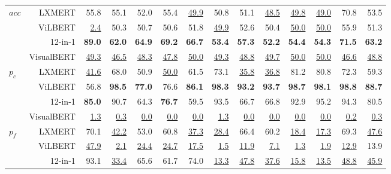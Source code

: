 \documentclass[11pt]{article}
\newcommand\redtable[1]{\underline{#1}}
\begin{document}
\begin{table*}[t!]
{\begin{tabular}{ l r r@{\hskip 0.2in}r@{\hskip 0.2in}rrr@{\hskip 0.2in}r@{\hskip 0.2in}rr@{\hskip 0.2in}rr@{\hskip 0.2in}r@{\hskip 0.2in}r }
        \cmidrule{2-14}
        \multirow{4}{*}{$acc$}
        & \multirow{1}{*}{LXMERT} & 55.8 & 55.1 & 52.0 & 55.4 & \redtable{49.9} & 50.8 & 51.1 & \redtable{48.5} & \redtable{49.8} & \redtable{49.0} & 70.8 & 53.5 \\
        & \multirow{1}{*}{ViLBERT} & \redtable{2.4} & 50.3 & 50.7 & 50.6 & 51.8 & \redtable{49.9} & 52.6 & 50.4 & \redtable{50.0} & \redtable{50.0} & 55.9 & 51.3 \\
        & \multirow{1}{*}{12-in-1} & {\bf 89.0} & {\bf 62.0} & {\bf 64.9} & {\bf 69.2} & {\bf 66.7} & {\bf 53.4} & {\bf 57.3} & {\bf 52.2} & {\bf 54.4} & {\bf 54.3} & {\bf 71.5} & {\bf 63.2} \\
        & \multirow{1}{*}{VisualBERT} & \redtable{49.3} & \redtable{46.5} & \redtable{48.3} & \redtable{47.8} & \redtable{50.0} & \redtable{49.3} & \redtable{48.8} & \redtable{49.7} & \redtable{50.0} & \redtable{50.0} & \redtable{46.6} & \redtable{48.8} \\
        \cmidrule{2-14}
\cmidrule{2-14}
        \multirow{4}{*}{$p_c$}
        & \multirow{1}{*}{LXMERT} & \redtable{41.6}  & 68.0 & 50.9 & \redtable{50.0} & 61.5 & 73.1 & \redtable{35.8} & \redtable{36.8} & 81.2 & 80.8 & 72.3 & 59.3 \\
        & \multirow{1}{*}{ViLBERT} & 56.8 & {\bf 98.5} & {\bf 77.0} & 76.6 & {\bf 86.1} & {\bf 98.3} & {\bf 93.2} & {\bf 93.7} & {\bf 98.7} & {\bf 98.1} & {\bf 98.8} & {\bf 88.7} \\
        & \multirow{1}{*}{12-in-1} & {\bf 85.0} & 90.7 & 64.3 & {\bf 76.7} & 59.5 & 93.5 & 66.7 & 66.8 & 92.9 & 95.2 & 94.3 & 80.5 \\
        & \multirow{1}{*}{VisualBERT} & \redtable{1.3}  & \redtable{0.3} & \redtable{0.0} & \redtable{0.0} & \redtable{0.0} & \redtable{1.3} & \redtable{0.0} & \redtable{0.0} & \redtable{0.0} & \redtable{0.0} & \redtable{0.2} & \redtable{0.3} \\
        \cmidrule{2-14}
        \multirow{4}{*}{$p_f$}
        & \multirow{1}{*}{LXMERT} & 70.1 & \redtable{42.2} & 53.0 & 60.8 & \redtable{37.3} & \redtable{28.4} & 66.4 & 60.2 & \redtable{18.4} & \redtable{17.3} & 69.3 & \redtable{47.6} \\
        & \multirow{1}{*}{ViLBERT} & \redtable{47.9} & \redtable{2.1} & \redtable{24.4} & \redtable{24.7} & \redtable{17.5} & \redtable{1.5} & \redtable{11.9} & \redtable{7.1} & \redtable{1.3} & \redtable{1.9} & \redtable{12.9} & 13.9 \\
        & \multirow{1}{*}{12-in-1} & 93.1 & \redtable{33.4} & 65.6 & 61.7 & 74.0 & \redtable{13.3} & \redtable{47.8} & \redtable{37.6} & \redtable{15.8} & \redtable{13.5} & \redtable{48.8} & \redtable{45.9} \\

\end{tabular}}
\end{table*}
\end{document}

